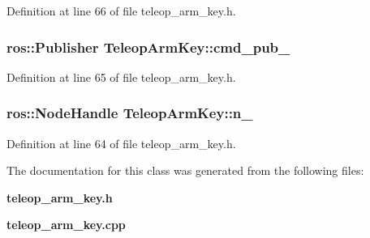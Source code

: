 \-Definition at line 66 of file teleop\-\_\-arm\-\_\-key.\-h.

\subsubsection[{cmd\-\_\-pub\-\_\-}]{\setlength{\rightskip}{0pt plus 5cm}ros\-::\-Publisher {\bf \-Teleop\-Arm\-Key\-::cmd\-\_\-pub\-\_\-}\hspace{0.3cm}{\ttfamily  [private]}}\label{classTeleopArmKey_a4af07ab0f477cee06bc8355376e9d6f8}


\-Definition at line 65 of file teleop\-\_\-arm\-\_\-key.\-h.

\subsubsection[{n\-\_\-}]{\setlength{\rightskip}{0pt plus 5cm}ros\-::\-Node\-Handle {\bf \-Teleop\-Arm\-Key\-::n\-\_\-}\hspace{0.3cm}{\ttfamily  [private]}}\label{classTeleopArmKey_a23af94e76d98494d2e2ee989179ee48d}


\-Definition at line 64 of file teleop\-\_\-arm\-\_\-key.\-h.



\-The documentation for this class was generated from the following files\-:\begin{DoxyCompactItemize}
\item 
{\bf teleop\-\_\-arm\-\_\-key.\-h}\item 
{\bf teleop\-\_\-arm\-\_\-key.\-cpp}\end{DoxyCompactItemize}
